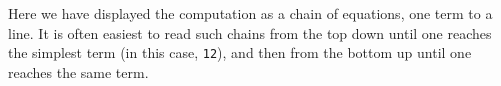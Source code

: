 \begin{fence}
\begin{code}%
\>[0]\AgdaFunction{\AgdaUnderscore{}}\AgdaSpace{}%
\AgdaSymbol{:}\AgdaSpace{}%
\AgdaSymbol{(}\AgdaSpace{}%
\AgdaOperator{\AgdaPrimitive{+}}\AgdaSpace{}%
\AgdaSymbol{)}\AgdaSpace{}%
\AgdaOperator{\AgdaPrimitive{+}}\AgdaSpace{}%
\AgdaSpace{}%
\AgdaSpace{}%
\AgdaSpace{}%
\AgdaOperator{\AgdaPrimitive{+}}\AgdaSpace{}%
\AgdaSymbol{(}\AgdaSpace{}%
\AgdaOperator{\AgdaPrimitive{+}}\AgdaSpace{}%
\AgdaSymbol{)}\<%
\\
\>[0]\AgdaSymbol{\AgdaUnderscore{}}%
\>[38I]\AgdaSymbol{=}\<%
\\
\>[.][@{}l@{}]\<[38I]%
\>[2]\<%
\\
\>[2][@{}l@{\AgdaIndent{0}}]%
\>[4]\AgdaSymbol{(}\AgdaSpace{}%
\AgdaOperator{\AgdaPrimitive{+}}\AgdaSpace{}%
\AgdaSymbol{)}\AgdaSpace{}%
\AgdaOperator{\AgdaPrimitive{+}}\AgdaSpace{}%
\<%
\\
%
\>[2]\<%
\\
\>[2][@{}l@{\AgdaIndent{0}}]%
\>[4]\AgdaSpace{}%
\AgdaOperator{\AgdaPrimitive{+}}\AgdaSpace{}%
\<%
\\
%
\>[2]\<%
\\
\>[2][@{}l@{\AgdaIndent{0}}]%
\>[4]\<%
\\
%
\>[2]\<%
\\
\>[2][@{}l@{\AgdaIndent{0}}]%
\>[4]\AgdaSpace{}%
\AgdaOperator{\AgdaPrimitive{+}}\AgdaSpace{}%
\<%
\\
%
\>[2]\<%
\\
\>[2][@{}l@{\AgdaIndent{0}}]%
\>[4]\AgdaSpace{}%
\AgdaOperator{\AgdaPrimitive{+}}\AgdaSpace{}%
\AgdaSymbol{(}\AgdaSpace{}%
\AgdaOperator{\AgdaPrimitive{+}}\AgdaSpace{}%
\AgdaSymbol{)}\<%
\\
%
\>[2]\<%
\end{code}
\end{fence}

Here we have displayed the computation as a chain of equations, one term
to a line. It is often easiest to read such chains from the top down
until one reaches the simplest term (in this case, \texttt{12}), and
then from the bottom up until one reaches the same term.

